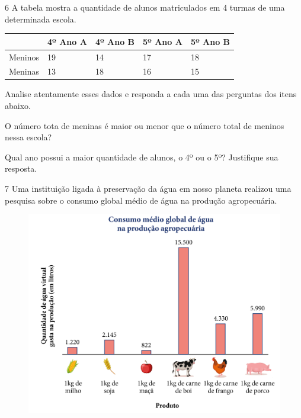\num{6} A tabela mostra a quantidade de alunos matriculados em 4 turmas de
uma determinada escola.

\begin{longtable}[]{@{}lllll@{}}
\toprule
& 4º Ano A & 4º Ano B & 5º Ano A & 5º Ano B\tabularnewline
\midrule
\endhead
Meninos & 19 & 14 & 17 & 18\tabularnewline
Meninas & 13 & 18 & 16 & 15\tabularnewline
\bottomrule
\end{longtable}

Analise atentamente esses dados e responda a cada uma das perguntas dos
itens abaixo.

\begin{escolha}
\item
  O número tota de meninas é maior ou menor que o número total de
  meninos nessa escola?

\item {}

\item
  Qual ano possui a maior quantidade de alunos, o 4º ou o 5º? Justifique
  sua resposta.

\item {}
\end{escolha}

\pagebreak

\num{7} Uma instituição ligada à preservação da água em nosso planeta
realizou uma pesquisa sobre o consumo global médio de água na produção
agropecuária.

\begin{figure}[htpb!]
\includegraphics[width=\textwidth]{../ilustracoes/MAT5/SAEB_5ANO_MAT_figura106.png}
\end{figure}


